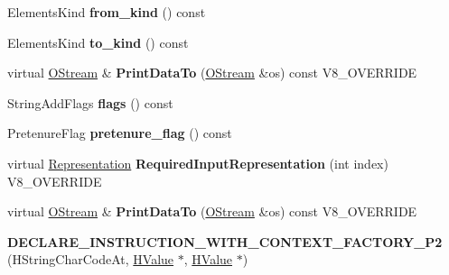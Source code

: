 \begin{DoxyCompactItemize}
\item 
\hypertarget{classv8_1_1internal_1_1_v8___f_i_n_a_l_a86fb384c47e0dcdbb1078c3e52e966b9}{}Elements\+Kind {\bfseries from\+\_\+kind} () const \label{classv8_1_1internal_1_1_v8___f_i_n_a_l_a86fb384c47e0dcdbb1078c3e52e966b9}

\item 
\hypertarget{classv8_1_1internal_1_1_v8___f_i_n_a_l_a5da714e8c522f8895659c5bc4eee88d7}{}Elements\+Kind {\bfseries to\+\_\+kind} () const \label{classv8_1_1internal_1_1_v8___f_i_n_a_l_a5da714e8c522f8895659c5bc4eee88d7}

\item 
\hypertarget{classv8_1_1internal_1_1_v8___f_i_n_a_l_ac450dad970b14246be761ccf5004924b}{}virtual \hyperlink{classv8_1_1internal_1_1_o_stream}{O\+Stream} \& {\bfseries Print\+Data\+To} (\hyperlink{classv8_1_1internal_1_1_o_stream}{O\+Stream} \&os) const V8\+\_\+\+O\+V\+E\+R\+R\+I\+D\+E\label{classv8_1_1internal_1_1_v8___f_i_n_a_l_ac450dad970b14246be761ccf5004924b}

\item 
\hypertarget{classv8_1_1internal_1_1_v8___f_i_n_a_l_a108bef9f093ff04e5ea9c0d9644aa6bc}{}String\+Add\+Flags {\bfseries flags} () const \label{classv8_1_1internal_1_1_v8___f_i_n_a_l_a108bef9f093ff04e5ea9c0d9644aa6bc}

\item 
\hypertarget{classv8_1_1internal_1_1_v8___f_i_n_a_l_ab665a915fb3f2ed151813c92fef3337e}{}Pretenure\+Flag {\bfseries pretenure\+\_\+flag} () const \label{classv8_1_1internal_1_1_v8___f_i_n_a_l_ab665a915fb3f2ed151813c92fef3337e}

\item 
\hypertarget{classv8_1_1internal_1_1_v8___f_i_n_a_l_a6c6d1f37f40b113d8f4062f1ffff7215}{}virtual \hyperlink{classv8_1_1internal_1_1_representation}{Representation} {\bfseries Required\+Input\+Representation} (int index) V8\+\_\+\+O\+V\+E\+R\+R\+I\+D\+E\label{classv8_1_1internal_1_1_v8___f_i_n_a_l_a6c6d1f37f40b113d8f4062f1ffff7215}

\item 
\hypertarget{classv8_1_1internal_1_1_v8___f_i_n_a_l_ac450dad970b14246be761ccf5004924b}{}virtual \hyperlink{classv8_1_1internal_1_1_o_stream}{O\+Stream} \& {\bfseries Print\+Data\+To} (\hyperlink{classv8_1_1internal_1_1_o_stream}{O\+Stream} \&os) const V8\+\_\+\+O\+V\+E\+R\+R\+I\+D\+E\label{classv8_1_1internal_1_1_v8___f_i_n_a_l_ac450dad970b14246be761ccf5004924b}

\item 
\hypertarget{classv8_1_1internal_1_1_v8___f_i_n_a_l_a5bfe8f55c26aeecb61056f150c42b310}{}{\bfseries D\+E\+C\+L\+A\+R\+E\+\_\+\+I\+N\+S\+T\+R\+U\+C\+T\+I\+O\+N\+\_\+\+W\+I\+T\+H\+\_\+\+C\+O\+N\+T\+E\+X\+T\+\_\+\+F\+A\+C\+T\+O\+R\+Y\+\_\+\+P2} (H\+String\+Char\+Code\+At, \hyperlink{classv8_1_1internal_1_1_h_value}{H\+Value} $\ast$, \hyperlink{classv8_1_1internal_1_1_h_value}{H\+Value} $\ast$)\label{classv8_1_1internal_1_1_v8___f_i_n_a_l_a5bfe8f55c26aeecb61056f150c42b310}


\end{DoxyCompactItemize}
